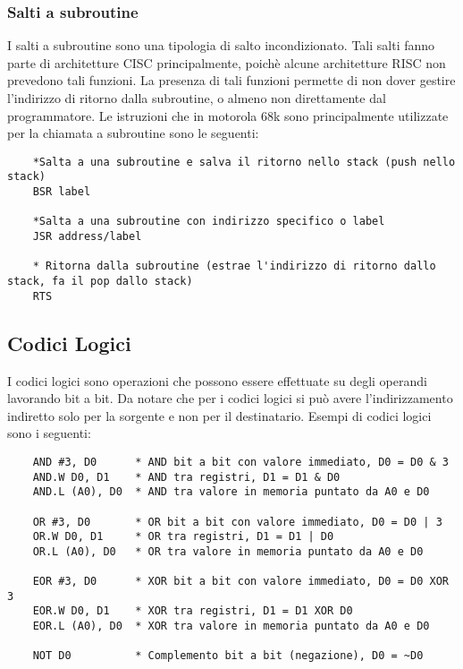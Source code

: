 \newpage

\subsubsection{Salti a subroutine}
I salti a subroutine sono una tipologia di salto incondizionato. Tali salti fanno parte di architetture CISC principalmente, poichè alcune architetture RISC non prevedono tali funzioni. La presenza di tali funzioni permette di non dover gestire l'indirizzo di ritorno dalla subroutine, o almeno non direttamente dal programmatore. Le istruzioni che in motorola 68k sono principalmente utilizzate per la chiamata a subroutine sono le seguenti:
\begin{lstlisting}
    *Salta a una subroutine e salva il ritorno nello stack (push nello stack)
    BSR label

    *Salta a una subroutine con indirizzo specifico o label
    JSR address/label

    * Ritorna dalla subroutine (estrae l'indirizzo di ritorno dallo stack, fa il pop dallo stack)
    RTS
\end{lstlisting}

\subsection{Codici Logici}
I codici logici sono operazioni che possono essere effettuate su degli operandi lavorando bit a bit. Da notare che per i codici logici si può avere l'indirizzamento indiretto solo per la sorgente e non per il destinatario. Esempi di codici logici sono i seguenti:
\begin{lstlisting}
    AND #3, D0      * AND bit a bit con valore immediato, D0 = D0 & 3
    AND.W D0, D1    * AND tra registri, D1 = D1 & D0
    AND.L (A0), D0  * AND tra valore in memoria puntato da A0 e D0

    OR #3, D0       * OR bit a bit con valore immediato, D0 = D0 | 3
    OR.W D0, D1     * OR tra registri, D1 = D1 | D0
    OR.L (A0), D0   * OR tra valore in memoria puntato da A0 e D0

    EOR #3, D0      * XOR bit a bit con valore immediato, D0 = D0 XOR 3
    EOR.W D0, D1    * XOR tra registri, D1 = D1 XOR D0
    EOR.L (A0), D0  * XOR tra valore in memoria puntato da A0 e D0

    NOT D0          * Complemento bit a bit (negazione), D0 = ~D0
\end{lstlisting}

\newpage

